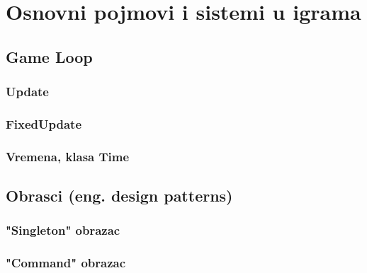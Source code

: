 \clearpage
\section{Osnovni pojmovi i sistemi u igrama}
\label{sec:Section_Name}

\subsection{Game Loop}

\subsubsection{Update}
\subsubsection{FixedUpdate}
\subsubsection{Vremena, klasa Time}

\subsection{Obrasci (eng. design patterns)}
\subsubsection{"Singleton" obrazac}
\subsubsection{"Command" obrazac}
